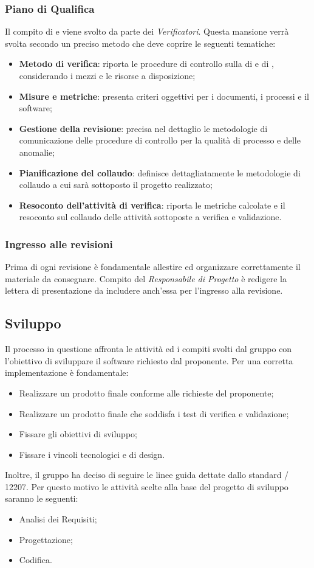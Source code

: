 \subsubsection{Piano di Qualifica}
Il compito di  e  viene svolto da parte dei \emph{Verificatori}. Questa mansione verrà svolta secondo un preciso metodo che deve coprire le seguenti tematiche:
\begin{itemize}
	\item\textbf{{Metodo di verifica}}: riporta le procedure di controllo sulla  di  e di , considerando i mezzi e le risorse a disposizione;
	\item\textbf{{Misure e metriche}}: presenta criteri oggettivi per i documenti, i processi e il software;
	\item\textbf{{Gestione della revisione}}: precisa nel dettaglio le metodologie di comunicazione delle procedure di controllo per la qualità di processo e delle anomalie;
	\item\textbf{{Pianificazione del collaudo}}: definisce dettagliatamente le metodologie di collaudo a cui sarà sottoposto il progetto realizzato;
	\item\textbf{{Resoconto dell'attività di verifica}}: riporta le metriche calcolate e il resoconto sul collaudo delle attività sottoposte a verifica e validazione.
\end{itemize}


\subsubsection{Ingresso alle revisioni}
Prima di ogni revisione è fondamentale allestire ed organizzare correttamente il materiale da consegnare. Compito del \emph{Responsabile di Progetto} è redigere la lettera di presentazione da includere anch'essa per l'ingresso alla revisione.

\subsection{Sviluppo}
Il processo in questione affronta le attività ed i compiti svolti dal gruppo con l'obiettivo di sviluppare il software richiesto dal proponente. Per una corretta implementazione è fondamentale:
\begin{itemize}
		\item Realizzare un prodotto finale conforme alle richieste del proponente;
		\item Realizzare un prodotto finale che soddisfa i test di verifica e validazione;
		\item Fissare gli obiettivi di sviluppo;
		\item Fissare i vincoli tecnologici e di design.
\end{itemize}
Inoltre, il gruppo ha deciso di seguire le linee guida dettate dallo standard / 12207. Per questo motivo le attività scelte alla base del progetto di sviluppo saranno le seguenti:
\begin{itemize}
	\item Analisi dei Requisiti;
	\item Progettazione;
	\item Codifica.
\end{itemize}
